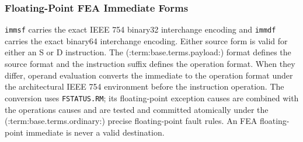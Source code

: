 \subsubsection{Floating-Point FEA Immediate Forms}
\texttt{immsf} carries the exact IEEE 754 binary32 interchange encoding and \texttt{immdf} carries the exact
binary64 interchange encoding. Either source form is valid for either an S or D instruction. The (:term:base.terms.payload:) format
defines the source format and the instruction suffix defines the operation format. When they differ, operand
evaluation converts the immediate to the operation format under the architectural IEEE 754 environment before the
instruction operation. The conversion uses \texttt{FSTATUS.RM}; its floating-point exception causes are combined
with the operation\textquotesingle{}s causes and are tested and committed atomically under the (:term:base.terms.ordinary:) precise floating-point fault
rules. An FEA floating-point immediate is never a valid destination.
